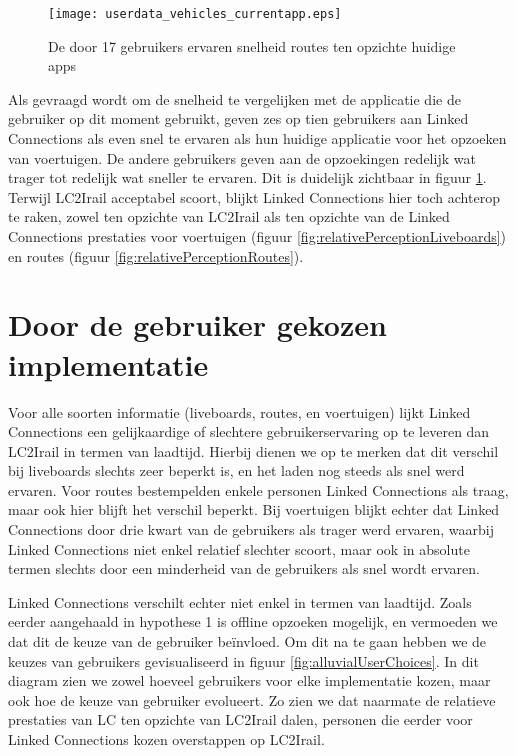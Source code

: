 \begin{figure}[ht]
	\centering
	\texttt{[image: userdata\_vehicles\_currentapp.eps]}
	\caption[Door gebruikers ervaren snelheid voertuigen tov huidige apps]{De door 17 gebruikers ervaren snelheid routes ten opzichte huidige apps }
	\label{fig:relativePerceptionVehicles}
\end{figure}

Als gevraagd wordt om de snelheid te vergelijken met de applicatie die de gebruiker op dit moment gebruikt, geven zes op tien gebruikers aan Linked Connections als even snel te ervaren als hun huidige applicatie voor het opzoeken van voertuigen. De andere gebruikers geven aan de opzoekingen redelijk wat trager tot redelijk wat sneller te ervaren. Dit is duidelijk zichtbaar in figuur \ref{fig:relativePerceptionVehicles}. Terwijl LC2Irail acceptabel scoort, blijkt Linked Connections hier toch achterop te raken, zowel ten opzichte van LC2Irail als ten opzichte van de Linked Connections prestaties voor voertuigen (figuur \ref{fig:relativePerceptionLiveboards}) en routes (figuur \ref{fig:relativePerceptionRoutes}).

\section{Door de gebruiker gekozen implementatie}

Voor alle soorten informatie (liveboards, routes, en voertuigen) lijkt Linked Connections een gelijkaardige of slechtere gebruikerservaring op te leveren dan LC2Irail in termen van laadtijd. Hierbij dienen we op te merken dat dit verschil bij liveboards slechts zeer beperkt is, en het laden nog steeds als snel werd ervaren. Voor routes bestempelden enkele personen Linked Connections als traag, maar ook hier blijft het verschil beperkt. Bij voertuigen blijkt echter dat Linked Connections door drie kwart van de gebruikers als trager werd ervaren, waarbij Linked Connections niet enkel relatief slechter scoort, maar ook in absolute termen slechts door een minderheid van de gebruikers als snel wordt ervaren. 

Linked Connections verschilt echter niet enkel in termen van laadtijd. Zoals eerder aangehaald in hypothese 1 is offline opzoeken mogelijk, en vermoeden we dat dit de keuze van de gebruiker beïnvloed. Om dit na te gaan hebben we de keuzes van gebruikers gevisualiseerd in figuur \ref{fig:alluvialUserChoices}. In dit diagram zien we zowel hoeveel gebruikers voor elke implementatie kozen, maar ook hoe de keuze van gebruiker evolueert. Zo zien we dat naarmate de relatieve prestaties van LC ten opzichte van LC2Irail dalen, personen die eerder voor Linked Connections kozen overstappen op LC2Irail.

